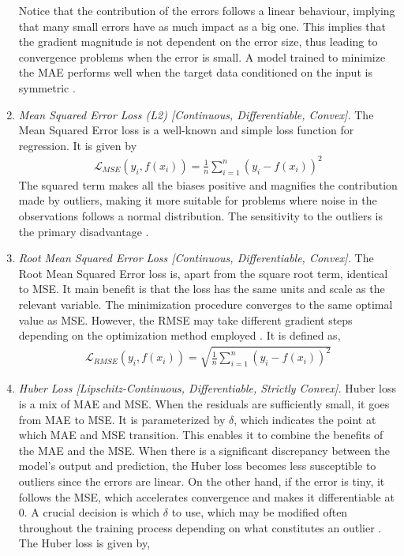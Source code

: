 \documentclass{article}
\begin{document}
\begin{enumerate}
    Notice that the contribution of the errors follows a linear behaviour, implying that many small errors have as much impact as a big one. This implies that the gradient magnitude is not dependent on the error size, thus leading to convergence problems when the error is small. A model trained to minimize the MAE performs well when the target data conditioned on the input is symmetric \citep{ciampiconi2023survey}.
    \item \textit{Mean Squared Error Loss (L2) [Continuous, Differentiable, Convex].} The Mean Squared Error loss is a well-known and simple loss function for regression. It is given by 
    \begin{equation}
      \begin{split}
        \mathcal{L}_{MSE}(y_i, f(x_i)) = \frac{1}{n} \sum^{n}_{i=1} (y_i-f(x_i))^2
      \end{split}
    \end{equation}
The squared term makes all the biases positive and magnifies the contribution made by outliers, making it more suitable for problems where noise in the observations follows a normal distribution. The sensitivity to the outliers is the primary disadvantage \citep{ciampiconi2023survey}.
    \item \textit{Root Mean Squared Error Loss [Continuous, Differentiable, Convex].} The Root Mean Squared Error loss is, apart from the square root term, identical to MSE. It main benefit is that the loss has the same units and scale as the relevant variable. The minimization procedure converges to the same optimal value as MSE. However, the RMSE may take different gradient steps depending on the optimization method employed \citep{ciampiconi2023survey}. It is defined as, 
    \begin{equation}
      \begin{split}
        \mathcal{L}_{RMSE}(y_i, f(x_i)) = \sqrt{\frac{1}{n} \sum^{n}_{i=1} (y_i-f(x_i))^2}
      \end{split}
    \end{equation}
    \item \textit{Huber Loss [Lipschitz-Continuous, Differentiable, Strictly Convex].} Huber loss is a mix of MAE and MSE. When the residuals are sufficiently small, it goes from MAE to MSE. It is parameterized by $\delta$, which indicates the point at which MAE and MSE transition. This enables it to combine the benefits of the MAE and the MSE. When there is a significant discrepancy between the model's output and prediction, the Huber loss becomes less susceptible to outliers since the errors are linear. On the other hand, if the error is tiny, it follows the MSE, which accelerates convergence and makes it differentiable at $0$. A crucial decision is which $\delta$ to use, which may be modified often throughout the training process depending on what constitutes an outlier \citep{ciampiconi2023survey}. The Huber loss is given by,

\end{enumerate}
\end{document}
